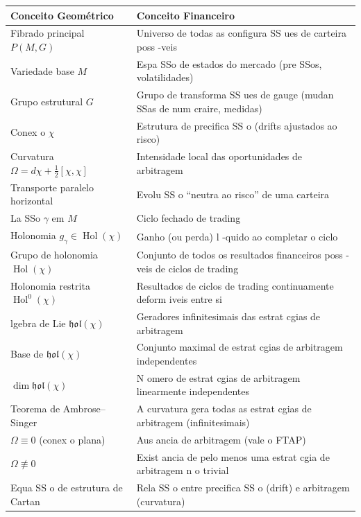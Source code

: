 \begin{center}
\begin{tabular}{@{}>{\raggedright\arraybackslash}p{5.5cm}>{\raggedright\arraybackslash}p{5.5cm}@{}}
\toprule
\textbf{Conceito Geom\'etrico} & \textbf{Conceito Financeiro} \\
\midrule
Fibrado principal \(P(M,G)\) & Universo de todas as configura SS ues de carteira poss -veis \\
\addlinespace
Variedade base \(M\) & Espa SSo de estados do mercado (pre SSos, volatilidades) \\
\addlinespace
Grupo estrutural \(G\) & Grupo de transforma SS ues de gauge (mudan SSas de num craire, medidas) \\
\addlinespace
Conex o \(\chi\) & Estrutura de precifica SS o (drifts ajustados ao risco) \\
\addlinespace
Curvatura \(\Omega = d\chi + \frac{1}{2}[\chi,\chi]\) & Intensidade local das oportunidades de arbitragem \\
\addlinespace
Transporte paralelo horizontal & Evolu SS o ``neutra ao risco'' de uma carteira \\
\addlinespace
La SSo \(\gamma\) em \(M\) & Ciclo fechado de trading \\
\addlinespace
Holonomia \(g_\gamma \in \operatorname{Hol}(\chi)\) & Ganho (ou perda) l -quido ao completar o ciclo \\
\addlinespace
Grupo de holonomia \(\operatorname{Hol}(\chi)\) & Conjunto de todos os resultados financeiros poss -veis de ciclos de trading \\
\addlinespace
Holonomia restrita \(\operatorname{Hol}^0(\chi)\) & Resultados de ciclos de trading continuamente deform iveis entre si \\
\addlinespace
 lgebra de Lie \(\mathfrak{hol}(\chi)\) & Geradores infinitesimais das estrat cgias de arbitragem \\
\addlinespace
Base de \(\mathfrak{hol}(\chi)\) & Conjunto maximal de estrat cgias de arbitragem independentes \\
\addlinespace
\(\dim \mathfrak{hol}(\chi)\) & N omero de estrat cgias de arbitragem linearmente independentes \\
\addlinespace
Teorema de Ambrose--Singer & A curvatura gera todas as estrat cgias de arbitragem (infinitesimais) \\
\addlinespace
\(\Omega \equiv 0\) (conex o plana) & Aus ancia de arbitragem (vale o FTAP) \\
\addlinespace
\(\Omega \not\equiv 0\) & Exist ancia de pelo menos uma estrat cgia de arbitragem n o trivial \\
\addlinespace
Equa SS o de estrutura de Cartan & Rela SS o entre precifica SS o (drift) e arbitragem (curvatura) \\
\bottomrule
\end{tabular}
\end{center}

